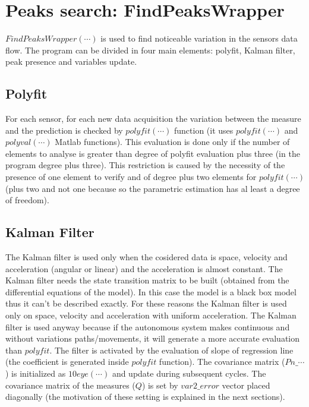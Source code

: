\documentclass[journal]{IEEEtran}
\begin{document}
\section{Peaks search: FindPeaksWrapper}

\(FindPeaksWrapper(\cdots)\) is used to find noticeable variation in the sensors data flow.
The program can be divided in four main elements: polyfit, Kalman filter, peak presence
and variables update.

\subsection{Polyfit}
For each sensor, for each new data acquisition the variation between the measure and the prediction
is checked by \(polyfit(\cdots)\) function (it uses \(polyfit(\cdots )\) and \(polyval(\cdots )\) Matlab functions).
This evaluation is done only if the number of elements to analyse is greater than degree of polyfit
evaluation plus three (in the program degree plus three). This restriction is caused by the necessity
of the presence of one element to verify and of degree plus two elements for \(polyfit(\cdots)\)
(plus two and not one because so the parametric estimation has al least a degree of freedom).

\subsection{Kalman Filter}
The Kalman filter is used only when the cosidered data is space, velocity and acceleration (angular or linear) and the acceleration is almost constant.
The Kalman filter needs the state transition matrix to be built (obtained from the differential equations of the model). In this case the model is a black box model thus it can't be described exactly. For these reasons the Kalman filter is used only on space, velocity and acceleration with uniform acceleration.
The Kalman filter is used anyway because if the autonomous system makes continuous and without variations paths/movements, it will generate a more accurate evaluation than \(polyfit\).
The filter is activated by the evaluation of slope of regression line (the coefficient is generated inside \(polyfit\) function).
The covariance matrix (\(Pn\_\cdots \)) is initialized as \(10\)\hspace{1mm}\(eye(\cdots)\) and update during subsequent cycles.
The covariance matrix of the measures (\(Q\)) is set by \(var2\_error\) vector placed diagonally (the motivation of these setting is explained in the next sections).
\end{document}
